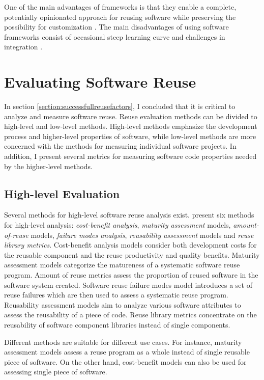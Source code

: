 One of the main advantages of frameworks is that they enable a complete, potentially opinionated approach for reusing software while preserving the possibility for customization \citep{johnson_frameworkscomponents+_1997}. The main disadvantages of using software frameworks consist of occasional steep learning curve and challenges in integration \citep{fayad_object-oriented_1997}.

\section{Evaluating Software Reuse}
\label{section:evaluatingreuse}

In section \ref{section:successfullreusefactors}, I concluded that it is critical to analyze and measure software reuse. Reuse evaluation methods can be divided to high-level and low-level methods. High-level methods emphasize the development process and higher-level properties of software, while low-level methods are more concerned with the methods for measuring individual software projects. In addition, I present several metrics for measuring software code properties needed by the higher-level methods.

\subsection{High-level Evaluation}

Several methods for high-level software reuse analysis exist. \citet{frakes_software_1996} present six methods for high-level analysis: \emph{cost-benefit analysis}, \emph{maturity assessment} models, \emph{amount-of-reuse} models, \emph{failure modes analysis}, \emph{reusability assessment} models and \emph{reuse library metrics}. Cost-benefit analysis models consider both development costs for the reusable component and the reuse productivity and quality benefits. Maturity assessment models categorize the matureness of a systematic software reuse program. Amount of reuse metrics assess the proportion of reused software in the software system created. Software reuse failure modes model introduces a set of reuse failures which are then used to assess a systematic reuse program. Reusability assessment models aim to analyze various software attributes to assess the reusability of a piece of code. Reuse library metrics concentrate on the reusability of software component libraries instead of single components.

Different methods are suitable for different use cases. For instance, maturity assessment models assess a reuse program as a whole instead of single reusable piece of software. On the other hand, cost-benefit models can also be used for assessing single piece of software.

